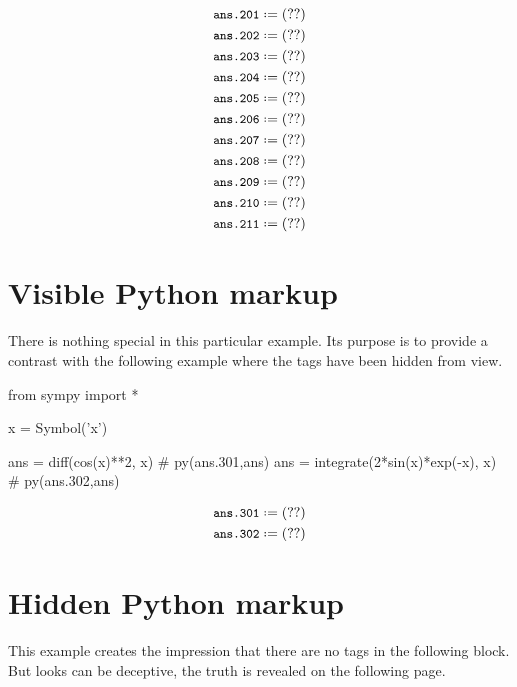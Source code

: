 \documentclass[12pt]{pylatex}
\begin{document}
\vspace{-10pt}

\begin{align*}
   &\py*{ans.201}\\
   &\py*{ans.202}\\
   &\py*{ans.203}\\
   &\py*{ans.204}\\
   &\py*{ans.205}\\
   &\py*{ans.206}\\
   &\py*{ans.207}\\
   &\py*{ans.208}\\
   &\py*{ans.209}\\
   &\py*{ans.210}\\
   &\py*{ans.211}
\end{align*}

\clearpage

\section*{Visible Python markup}

There is nothing special in this particular example. Its purpose is to provide a contrast with the following example where the tags have been hidden from view.

\vspace{5pt}


\begin{python}
   from sympy import *

   x = Symbol('x')

   ans = diff(cos(x)**2, x)                         # py(ans.301,ans)
   ans = integrate(2*sin(x)*exp(-x), x)             # py(ans.302,ans)
\end{python}

\begin{align*}
   &\py*{ans.301}\\
   &\py*{ans.302}
\end{align*}

\section*{Hidden Python markup}
This example creates the impression that there are no tags in the following block. But looks can be deceptive, the truth is revealed on the following page.

\vspace{5pt}
\end{document}
